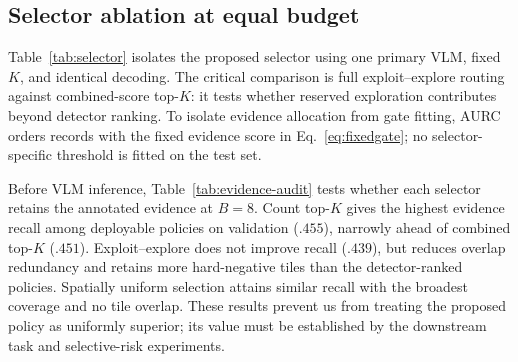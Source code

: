 \subsection{Selector ablation at equal budget}
Table~\ref{tab:selector} isolates the proposed selector using one primary VLM, fixed $K$, and identical decoding. The critical comparison is full exploit--explore routing against combined-score top-$K$: it tests whether reserved exploration contributes beyond detector ranking.
To isolate evidence allocation from gate fitting, AURC orders records with the fixed evidence score in Eq.~\eqref{eq:fixedgate}; no selector-specific threshold is fitted on the test set.

Before VLM inference, Table~\ref{tab:evidence-audit} tests whether each selector retains the annotated evidence at $B=8$. Count top-$K$ gives the highest evidence recall among deployable policies on validation ($.455$), narrowly ahead of combined top-$K$ ($.451$). Exploit--explore does not improve recall ($.439$), but reduces overlap redundancy and retains more hard-negative tiles than the detector-ranked policies. Spatially uniform selection attains similar recall with the broadest coverage and no tile overlap. These results prevent us from treating the proposed policy as uniformly superior; its value must be established by the downstream task and selective-risk experiments.

\begin{table}[t]
\centering
\wacvtablefont
\caption{Source-level validation audit at $B=8$. Evidence recall includes source-clustered 95\% CIs. GT oracle is diagnostic only.}
\label{tab:evidence-audit}
\setlength{\tabcolsep}{3.3pt}
\end{table}

